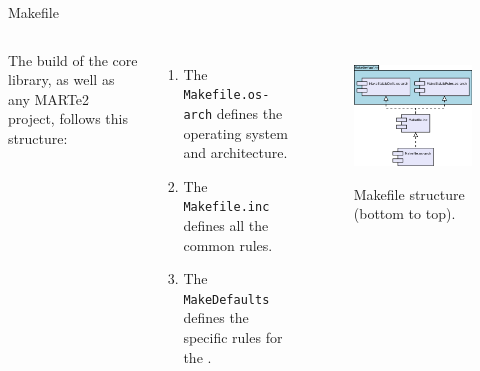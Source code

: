 \begin{frame}{Makefile}
	\begin{columns}
		The build of the core library, as well as any MARTe2 project, follows this structure:
		\begin{enumerate}
			\item The \texttt{Makefile.os-arch} defines the  operating system and architecture.
			\item The \texttt{Makefile.inc} defines all the common rules.
			\item The \texttt{MakeDefaults} defines the specific rules for the .
		\end{enumerate}
		\begin{figure}
			\centering
			\includegraphics[scale=.4]{Makefiles.png}
			\label{fig:makefiles}
			\caption{Makefile structure (bottom to top).}
		\end{figure}
	\end{columns}
\end{frame}
